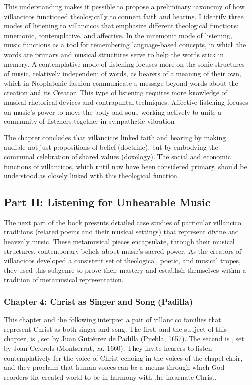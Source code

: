 \documentclass{vcbook-proposal}
\begin{document}
This understanding makes it possible to propose a preliminary taxonomy of how villancicos functioned theologically to connect faith and hearing. 
I identify three modes of listening to villancicos that emphasize different theological functions: mnemonic, contemplative, and affective.
In the mnemonic mode of listening, music functions as a tool for remembering language-based concepts, in which the words are primary and musical structures serve to help the words stick in memory.
A contemplative mode of listening focuses more on the sonic structures of  music, relatively independent of words, as bearers of a meaning of their own, which in Neoplatonic fashion communicate a message beyond words about the creation and its Creator.
This type of listening requires more knowledge of musical-rhetorical devices and contrapuntal techniques. 
Affective listening focuses on music's power to move the body and soul, working actively to unite a community of listeners together in sympathetic vibration.

The chapter concludes that villancicos linked faith and hearing by making audible not just propositions of belief (doctrine), but by embodying the communal celebration of shared values (doxology).
The social and economic functions of villancicos, which until now have been considered primary, should be understood as closely linked with this theological function.

\subsection{Part II: Listening for Unhearable Music}

The next part of the book presents detailed case studies of particular villancico traditions (related poems and their musical settings) that represent divine and heavenly music.
These metamusical pieces encapsulate, through their musical structures, contemporary beliefs about music's sacred power.
As the creators of villancicos developed a consistent set of theological, poetic, and musical tropes, they used this subgenre to prove their mastery and establish themselves within a tradition of metamusical representation.

\subsubsection{Chapter 4: Christ as Singer and Song (Padilla)}

This chapter and the following interpret a pair of villancico families that represent Christ as both singer and song.
The first, and the subject of this chapter, is , set by Juan Gutiérrez de Padilla (Puebla, 1657).
The second is , set by Joan Cererols (Montserrat, ca. 1660).
They invite hearers to listen contemplatively for the voice of Christ echoing in the voices of the chapel choir, and they proclaim that human voices can be a means through which God reorders the created world to be in harmony with the incarnate Christ.
\end{document}
